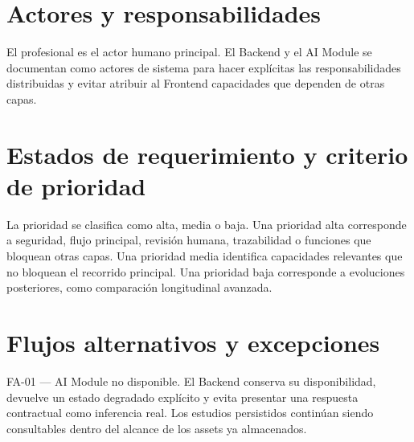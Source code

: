 \section{Actores y responsabilidades}


El profesional es el actor humano principal. El Backend y el AI Module se documentan como actores de sistema para hacer explícitas las responsabilidades distribuidas y evitar atribuir al Frontend capacidades que dependen de otras capas.

\section{Estados de requerimiento y criterio de prioridad}


La prioridad se clasifica como alta, media o baja. Una prioridad alta corresponde a seguridad, flujo principal, revisión humana, trazabilidad o funciones que bloquean otras capas. Una prioridad media identifica capacidades relevantes que no bloquean el recorrido principal. Una prioridad baja corresponde a evoluciones posteriores, como comparación longitudinal avanzada.

\section{Flujos alternativos y excepciones}

FA-01 — AI Module no disponible. El Backend conserva su disponibilidad, devuelve un estado degradado explícito y evita presentar una respuesta contractual como inferencia real. Los estudios persistidos continúan siendo consultables dentro del alcance de los assets ya almacenados.

